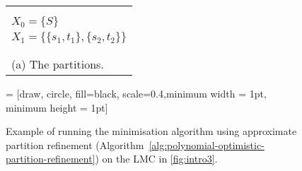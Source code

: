 \documentclass[a4paper,UKenglish,cleveref,autoref,thm-restate]{lipics-v2021}
\begin{document}
\begin{figure}
\begin{minipage}{0.45\textwidth}
	\centering	\vspace{0.2cm}
	\begin{tabular}{l}
		\\\\\\
		\hline%
		$X_0 = \{S\}$ \\
		$X_1 = \big\{  \{s_1,t_1\} , \{s_2,t_2\} \big\}$\\
		\hline
		\\\\
		(a) The partitions.
	\end{tabular}
\end{minipage}
\hfill
\begin{minipage}{0.45\textwidth}
	\centering
{} = [draw, circle, fill=black, scale=0.4,minimum width = 1pt, minimum height = 1pt]

\end{minipage}
\caption{Example of running the minimisation algorithm using approximate partition refinement (Algorithm~\ref{alg:polynomial-optimistic-partition-refinement}) on the LMC in \cref{fig:intro3}.} \label{fig:example-intro-approximate-partition-refinement}
\end{figure}
\end{document}
